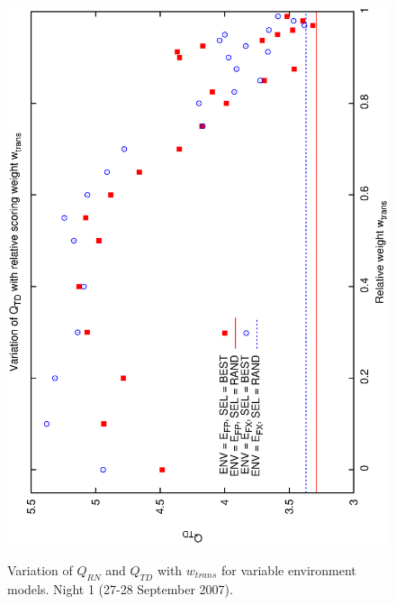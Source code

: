 \begin{figure}[h]
\begin{center}
{    \includegraphics[scale=0.5, angle=-90]{figures/cs1_dw1a2_td.eps}
    \label{fig:cs1_dw1a2_td}
  }
 \caption[Variation of $Q_{RN}$ and $Q_{TD}$ with $w_{trans}$  for variable environment models]
{Variation of $Q_{RN}$ and $Q_{TD}$ with $w_{trans}$  for variable environment models.  Night 1 (27-28 September 2007). }
\end{center}
\end{figure}

